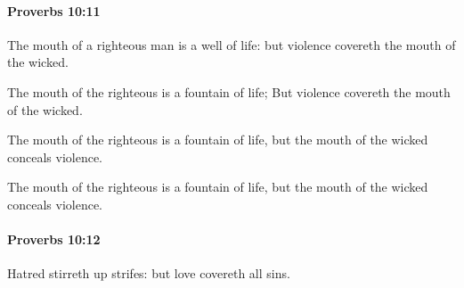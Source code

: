 		\paragraph{Proverbs 10:11} %
			\label{PROVERBS-10-11}

			The mouth of a righteous man is a well of life: but violence covereth the mouth of the wicked.

			\begin{versebox}
					\item[BHS] 
					\item[ASV] The mouth of the righteous is a fountain of life; But violence covereth the mouth of the wicked.
					\item[NIV] The mouth of the righteous is a fountain of life, but the mouth of the wicked conceals violence.
					\item[NRSV] The mouth of the righteous is a fountain of life, but the mouth of the wicked conceals violence.
			\end{versebox}

		\paragraph{Proverbs 10:12} %
			\label{PROVERBS-10-12}

			Hatred stirreth up strifes: but love covereth all sins.

